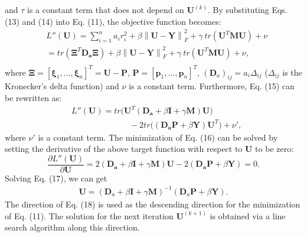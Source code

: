 \documentclass[conference]{IEEEtran}
\begin{document}
and $\tau$ is a constant term that does not depend on $\bm{U}^{(k)}$. By substituting Eqs. (13) and (14) into Eq. (11), the  objective function becomes:
\begin{equation}
\begin{split}
&L''(\bm{U})=\sum_{i=1}^na_ir_i^2 + \beta \left\lVert \bm{U} - \bm{Y} \right\rVert_F^2 + \gamma\ tr(\bm{U}^T\bm{M}\bm{U}) + \nu\\
&=tr(\bm{\Xi}^T \bm{D_a} \bm{\Xi}) + \beta \left\lVert \bm{U} - \bm{Y} \right\rVert_F^2 + \gamma \ tr(\bm{U}^T\bm{M}\bm{U}) + \nu,\\
\end{split}
\end{equation}
where $\bm{\Xi}=[\bm{\xi}_1, ... , \bm{\xi}_n]^T=\bm{U}-\bm{P}$, $\bm{P}=[\bm{p}_1, ... , \bm{p}_n]^T$, $(\bm{D}_a)_{ij}=a_i\Delta_{ij}$ ($\Delta_{ij}$ is the Kronecker's delta function) and $\nu$ is a constant term. Furthermore, Eq. (15) can be rewritten as:
\begin{equation}
\begin{split}
&L''(\bm{U})=tr\big(\bm{U}^T(\bm{D_a}+\beta\bm{I}+\gamma \bm{M})\bm{U}\big)\\
&\quad\quad\quad\quad\quad\quad\quad -2tr\big((\bm{D_a}\bm{P}+\beta \bm{Y})\bm{U}^T\big) + \nu',
\end{split}
\end{equation}
where $\nu'$ is a constant term. The minimization of Eq. (16) can be solved by setting the derivative of the above target function with respect to $\bm{U}$ to be zero:
\begin{equation}
\frac{\partial L''(\bm{U})}{\partial \bm{U}}=2(\bm{D_a}+\beta\bm{I}+\gamma \bm{M})\bm{U}-2(\bm{D_a}\bm{P}+\beta \bm{Y})=0.
\end{equation}
Solving Eq. (17), we can get
\begin{equation}
\begin{split}
\bm{U}=(\bm{D}_a+\beta\bm{I}+\gamma\bm{M})^{-1}(\bm{D}_a\bm{P}+\beta\bm{Y}).
\end{split}
\end{equation}
The direction of Eq. (18) is used as the descending direction for the minimization of Eq. (11). The solution for the next iteration $\bm{U}^{(k+1)}$ is obtained via a line search algorithm along this direction.
\end{document}
